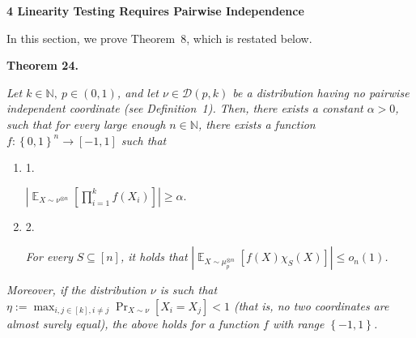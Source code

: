\documentclass[10pt,a4paper]{article}
\begin{document}
\par\medskip\noindent\textbf{
4 Linearity Testing Requires Pairwise Independence}\par




In this section, we prove Theorem 8, which is restated below.\par





\par\medskip\noindent\textbf{
\textbf{Theorem 24}\textbf{.}
}\par



\emph{Let $k\in\mathbb{N},\ p\in(0,1)$, and let $\nu\in\mathcal{D}(p,k)$ be a distribution having no pairwise independent coordinate (see Definition 1).
Then, there exists a constant $\alpha>0$, such that for every large enough $n\in\mathbb{N}$, there exists a function $f:\left\{0,1\right\}^{n}\to[-1,1]$ such that}\par


\begin{enumerate}


\item[] 
1. 


$\left|\mathop{\mathbb{E}}_{X\sim\nu^{\otimes n}}\left[\prod_{i=1}^{k}f(X_{i})\right]\right|\geqslant\alpha.$\emph{}\par





\item[] 
2. 


\emph{For every }$S\subseteq[n]$\emph{, it holds that }$\left|\mathop{\mathbb{E}}_{X\sim\mu_{p}^{\otimes n}}\left[f(X)\chi_{S}(X)\right]\right|\leqslant o_{n}(1)$\emph{.}\par





\end{enumerate}




\emph{Moreover, if the distribution $\nu$ is such that $\eta:=\max_{i,j\in[k],i\not=j}\Pr_{X\sim\nu}\left[X_{i}=X_{j}\right]<1$ (that is, no two coordinates are almost surely equal), the above holds for a function $f$ with range $\left\{-1,1\right\}$.}\par



\end{document}
